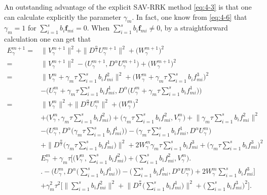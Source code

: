 \documentclass[preprint,compress,3p,10pt,fleqn]{elsarticle}
\numberwithin{equation}{section}
\begin{document}
An outstanding advantage of the explicit SAV-RRK method \eqref{eq:4-3} is that one can calculate
explicitly the parameter $\gamma_m$. In fact, one know from \eqref{eq:4-6} that $\gamma_m=1$ for $\sum\limits_{i=1}^s b_i \bm{f}_{m i}=0$. When $\sum\limits_{i=1}^s b_i \bm{f}_{m i}\neq 0$, by a straightforward calculation one can get that
\begin{align}
E_{\gamma}^{m+1}  =&\|V_{\gamma}^{m+1}\|^2+\|D^\frac{\alpha}{2} U_{\gamma}^{m+1}\|^2+\big(W_{\gamma}^{m+1}\big)^2 \nonumber\\
=&\|V_{\gamma}^{m+1}\|^2- \big(U_{\gamma}^{m+1}, D^{\alpha} U_{\gamma}^{m+1}\big)+\big(W_{\gamma}^{m+1}\big)^2 \nonumber\\
=&\|V_{\gamma}^{m}+\gamma_m\tau\sum\limits_{i=1}^{s}b_if_{mi}^2\|^2 +\big(W_{\gamma}^{m}+\gamma_m\tau\sum\limits_{i=1}^{s}b_if_{mi}^3\big)^2\nonumber\\
&- \big(U_{\gamma}^{m}+\gamma_m\tau\sum\limits_{i=1}^{s}b_if_{mi}^1, D^{\alpha} \big(U_{\gamma}^{m}+\gamma_m\tau\sum\limits_{i=1}^{s}b_if_{mi}^1\big)\big)\nonumber\\
=&\|V_{\gamma}^{m}\|^2+\|D^\frac{\alpha}{2} U_{\gamma}^{m}\|^2+\big(W_{\gamma}^{m}\big)^2\nonumber\\ &+\big(V_{\gamma}^{m},\gamma_m\tau\sum\limits_{i=1}^{s}b_if_{mi}^2\big)+\big(\gamma_m\tau\sum\limits_{i=1}^{s}b_if_{mi}^2,V_{\gamma}^{m}\big)+\big\|\gamma_m\tau\sum\limits_{i=1}^{s}b_if_{mi}^2\big\|^2\nonumber\\
&- \big(U_{\gamma}^{m}, D^{\alpha} \big(\gamma_m\tau\sum\limits_{i=1}^{s}b_if_{mi}^1\big)\big)- \big(\gamma_m\tau\sum\limits_{i=1}^{s}b_if_{mi}^1, D^{\alpha}U_{\gamma}^{m}\big)\nonumber\\
&+ \big\|D^\frac{\alpha}{2}\big(\gamma_m\tau\sum\limits_{i=1}^{s}b_if_{mi}^1\big)\big\|^2+2W_{\gamma}^{m}\gamma_m\tau\sum\limits_{i=1}^{s}b_if_{mi}^3+\big(\gamma_m\tau\sum\limits_{i=1}^{s}b_if_{mi}^3\big)^2\nonumber\\
=& E_{\gamma}^{m}+\gamma_m\tau\big[\big(V_{\gamma}^{m},\sum\limits_{i=1}^{s}b_if_{mi}^2\big)+\big(\sum\limits_{i=1}^{s}b_if_{mi}^2,V_{\gamma}^{m}\big)\big.\nonumber\\
&\big.-\big(U_{\gamma}^{m},D^{\alpha} \big(\sum\limits_{i=1}^{s}b_if_{mi}^1\big)\big)-\big(\sum\limits_{i=1}^{s}b_if_{mi}^1, D^{\alpha} U_{\gamma}^{m}\big)+2W_{\gamma}^{m}\sum\limits_{i=1}^{s}b_if_{mi}^3\big]\nonumber\\
&+\gamma_m^2\tau^2\big[\big\|\sum\limits_{i=1}^{s}b_if_{mi}^2\big\|^2+ \big\|D^\frac{\alpha}{2}\big(\sum\limits_{i=1}^{s}b_if_{mi}^1\big)\big\|^2+\big(\sum\limits_{i=1}^{s}b_if_{mi}^3\big)^2\big].\label{eq:49}
\end{align}
\end{document}
